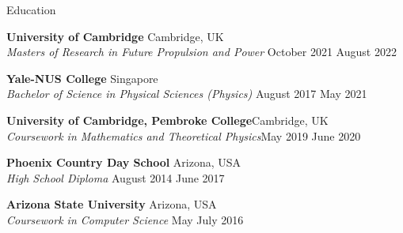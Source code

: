 \documentclass{resume} %
\begin{document}



\begin{rSection}{Education}

{\bf \large  University of Cambridge} \hfill {Cambridge, UK}\\
{\em Masters of Research in Future Propulsion and Power} \hfill { October 2021 {\textendash}  August 2022 }


{\bf \large  Yale-NUS College} \hfill { Singapore}\\
{\em Bachelor of Science in Physical Sciences (Physics)} \hfill { August 2017 {\textendash}  May 2021 }

{\bf \large  University of Cambridge, Pembroke College}\hfill{Cambridge, UK}\\
{\em Coursework in Mathematics and Theoretical Physics}\hfill{May 2019 {\textendash}   June 2020}


{\bf \large  Phoenix Country Day School} \hfill { Arizona, USA}\\
{\em High School Diploma} \hfill { August 2014 {\textendash}  June 2017}

{\bf \large  Arizona State University} \hfill { Arizona, USA}\\
{\em Coursework in Computer Science} \hfill { May {\textendash} July 2016}



\end{rSection}


\end{document}
